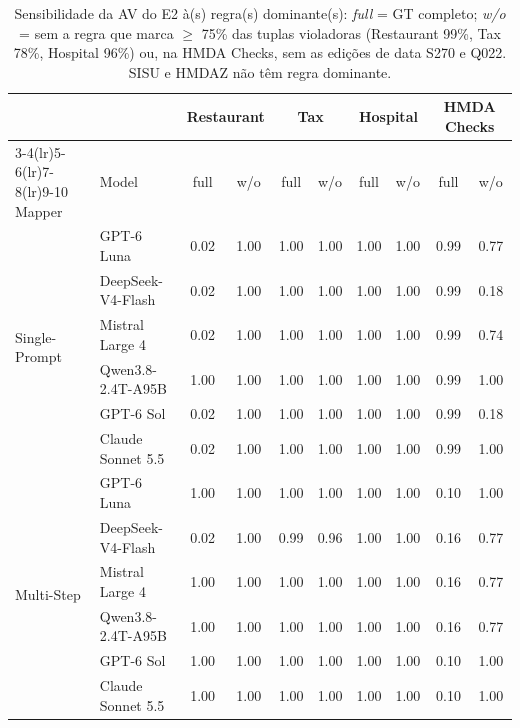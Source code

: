 \begin{table}[H]
\centering\scriptsize\setlength{\tabcolsep}{3pt}
\begin{tabular}{llcccccccc}
\toprule
 & & \multicolumn{2}{c}{Restaurant} & \multicolumn{2}{c}{Tax} & \multicolumn{2}{c}{Hospital} & \multicolumn{2}{c}{HMDA Checks} \\
\cmidrule(lr){3-4}\cmidrule(lr){5-6}\cmidrule(lr){7-8}\cmidrule(lr){9-10}
Mapper & Model & full & w/o & full & w/o & full & w/o & full & w/o \\
\midrule
\multirow{6}{*}{Single-Prompt} & GPT-6 Luna & 0.02 & 1.00 & 1.00 & 1.00 & 1.00 & 1.00 & 0.99 & 0.77 \\
 & DeepSeek-V4-Flash & 0.02 & 1.00 & 1.00 & 1.00 & 1.00 & 1.00 & 0.99 & 0.18 \\
 & Mistral Large 4 & 0.02 & 1.00 & 1.00 & 1.00 & 1.00 & 1.00 & 0.99 & 0.74 \\
 & Qwen3.8-2.4T-A95B & 1.00 & 1.00 & 1.00 & 1.00 & 1.00 & 1.00 & 0.99 & 1.00 \\
 & GPT-6 Sol & 0.02 & 1.00 & 1.00 & 1.00 & 1.00 & 1.00 & 0.99 & 0.18 \\
 & Claude Sonnet 5.5 & 0.02 & 1.00 & 1.00 & 1.00 & 1.00 & 1.00 & 0.99 & 1.00 \\
\midrule
\multirow{6}{*}{Multi-Step} & GPT-6 Luna & 1.00 & 1.00 & 1.00 & 1.00 & 1.00 & 1.00 & 0.10 & 1.00 \\
 & DeepSeek-V4-Flash & 0.02 & 1.00 & 0.99 & 0.96 & 1.00 & 1.00 & 0.16 & 0.77 \\
 & Mistral Large 4 & 1.00 & 1.00 & 1.00 & 1.00 & 1.00 & 1.00 & 0.16 & 0.77 \\
 & Qwen3.8-2.4T-A95B & 1.00 & 1.00 & 1.00 & 1.00 & 1.00 & 1.00 & 0.16 & 0.77 \\
 & GPT-6 Sol & 1.00 & 1.00 & 1.00 & 1.00 & 1.00 & 1.00 & 0.10 & 1.00 \\
 & Claude Sonnet 5.5 & 1.00 & 1.00 & 1.00 & 1.00 & 1.00 & 1.00 & 0.10 & 1.00 \\
\bottomrule
\end{tabular}
\caption{Sensibilidade da AV do E2 à(s) regra(s) dominante(s): \emph{full} = GT completo; \emph{w/o} = sem a regra que marca $\geq$ 75\% das tuplas violadoras (Restaurant 99\%, Tax 78\%, Hospital 96\%) ou, na HMDA Checks, sem as edições de data S270 e Q022. SISU e HMDAZ não têm regra dominante.}
\end{table}
